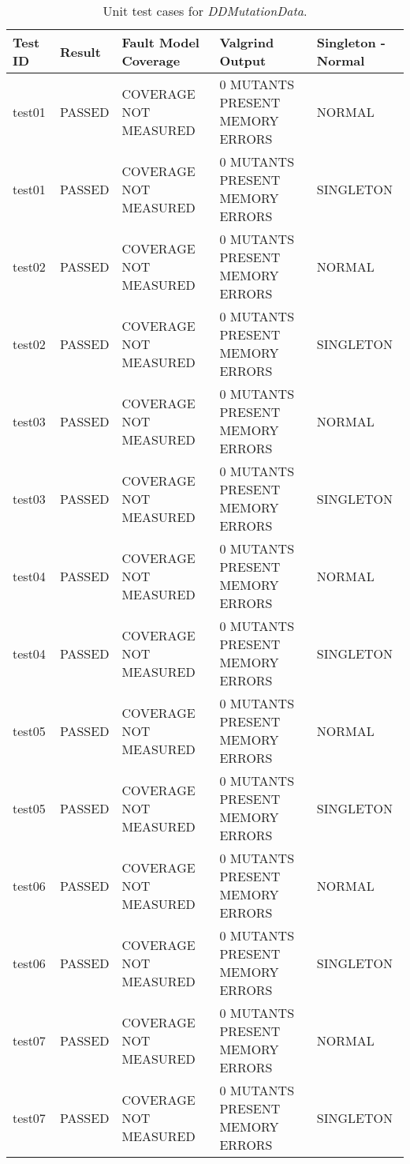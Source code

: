 
\setlength\LTleft{0pt}
\setlength\LTright{0pt}
\scriptsize

\begin{longtable}{|l|l|l|l|l|}

\caption{Unit test cases for \emph{DDMutationData}.}
\label{table:matrix_FAULT} \\

\hline
\textbf{Test ID} & \textbf{Result} & \textbf{Fault Model Coverage} & \textbf{Valgrind Output} & \textbf{Singleton - Normal} \\
\hline
test01 & PASSED & COVERAGE NOT MEASURED & 0 MUTANTS PRESENT MEMORY ERRORS & NORMAL\\
test01 & PASSED & COVERAGE NOT MEASURED & 0 MUTANTS PRESENT MEMORY ERRORS & SINGLETON\\
test02 & PASSED & COVERAGE NOT MEASURED & 0 MUTANTS PRESENT MEMORY ERRORS & NORMAL\\
test02 & PASSED & COVERAGE NOT MEASURED & 0 MUTANTS PRESENT MEMORY ERRORS & SINGLETON\\
test03 & PASSED & COVERAGE NOT MEASURED & 0 MUTANTS PRESENT MEMORY ERRORS & NORMAL\\
test03 & PASSED & COVERAGE NOT MEASURED & 0 MUTANTS PRESENT MEMORY ERRORS & SINGLETON\\
test04 & PASSED & COVERAGE NOT MEASURED & 0 MUTANTS PRESENT MEMORY ERRORS & NORMAL\\
test04 & PASSED & COVERAGE NOT MEASURED & 0 MUTANTS PRESENT MEMORY ERRORS & SINGLETON\\
test05 & PASSED & COVERAGE NOT MEASURED & 0 MUTANTS PRESENT MEMORY ERRORS & NORMAL\\
test05 & PASSED & COVERAGE NOT MEASURED & 0 MUTANTS PRESENT MEMORY ERRORS & SINGLETON\\
test06 & PASSED & COVERAGE NOT MEASURED & 0 MUTANTS PRESENT MEMORY ERRORS & NORMAL\\
test06 & PASSED & COVERAGE NOT MEASURED & 0 MUTANTS PRESENT MEMORY ERRORS & SINGLETON\\
test07 & PASSED & COVERAGE NOT MEASURED & 0 MUTANTS PRESENT MEMORY ERRORS & NORMAL\\
test07 & PASSED & COVERAGE NOT MEASURED & 0 MUTANTS PRESENT MEMORY ERRORS & SINGLETON\\

\end{longtable}
